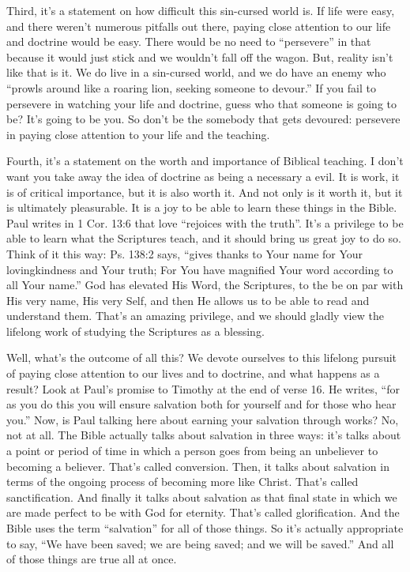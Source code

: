 \documentclass[letterpaper, 12pt]{article}
\begin{document}
    Third, it's a statement on how difficult this sin-cursed world is.
    If life were easy, and there weren't numerous pitfalls out there,
    paying close attention to our life and doctrine would be easy. There
    would be no need to ``persevere'' in that because it would just
    stick and we wouldn't fall off the wagon. But, reality isn't like
    that is it. We do live in a sin-cursed world, and we do have an
    enemy who ``prowls around like a roaring lion, seeking someone to
    devour.'' If you fail to persevere in watching your life and
    doctrine, guess who that someone is going to be? It's going to be
    you. So don't be the somebody that gets devoured: persevere in
    paying close attention to your life and the teaching.

    Fourth, it's a statement on the worth and importance of Biblical
    teaching. I don't want you take away the idea of doctrine as being a
    necessary a evil. It is work, it is of critical importance, but it
    is also worth it. And not only is it worth it, but it is ultimately
    pleasurable. It is a joy to be able to learn these things in the
    Bible. Paul writes in 1 Cor. 13:6 that love ``rejoices with the
    truth''. It's a privilege to be able to learn what the Scriptures
    teach, and it should bring us great joy to do so. Think of it this
    way: Ps. 138:2 says, ``gives thanks to Your name for Your
    lovingkindness and Your truth; For You have magnified Your word
    according to all Your name.'' God has elevated His Word, the
    Scriptures, to the be on par with His very name, His very Self, and
    then He allows us to be able to read and understand them. That's an
    amazing privilege, and we should gladly view the lifelong work of
    studying the Scriptures as a blessing.

    Well, what's the outcome of all this? We devote ourselves to this
    lifelong pursuit of paying close attention to our lives and to
    doctrine, and what happens as a result? Look at Paul's promise to
    Timothy at the end of verse 16. He writes, ``for as you do this you
    will ensure salvation both for yourself and for those who hear
    you.'' Now, is Paul talking here about earning your salvation
    through works? No, not at all. The Bible actually talks about
    salvation in three ways: it's talks about a point or period of time
    in which a person goes from being an unbeliever to becoming a
    believer. That's called conversion. Then, it talks about salvation
    in terms of the ongoing process of becoming more like Christ. That's
    called sanctification. And finally it talks about salvation as that
    final state in which we are made perfect to be with God for
    eternity. That's called glorification. And the Bible uses the term
    ``salvation'' for all of those things. So it's actually appropriate
    to say, ``We have been saved; we are being saved; and we will be
    saved.'' And all of those things are true all at once.
\end{document}

